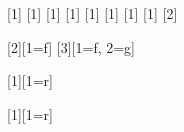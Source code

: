 \DeclarePairedDelimiterXPP{\Parens}[1]{\bm\begingroup}{\mathlarger{(}}{\mathlarger{)}}{\endgroup}{\mbox{}}
\DeclarePairedDelimiterXPP{\Braces}[1]{\bm\begingroup}{\mathlarger{\lbrace}}{\mathlarger{\rbrace}}{\endgroup}{\mbox{}}
\DeclarePairedDelimiterXPP{\Bracks}[1]{\bm\begingroup}{\mathlarger{[}}{\mathlarger{]}}{\endgroup}{\mbox{}}
\DeclarePairedDelimiterXPP{\Verts}[1]{\bm\begingroup}{\mathlarger{\lvert}}{\mathlarger{\rvert}}{\endgroup}{\mbox{}}
\DeclarePairedDelimiterXPP{\Dverts}[1]{\bm\begingroup}{\mathlarger{\lVert}}{\mathlarger{\rVert}}{\endgroup}{\mbox{}}
\DeclarePairedDelimiterXPP{\Angles}[1]{\bm\begingroup}{\mathlarger{\langle}}{\mathlarger{\rangle}}{\endgroup}{\mbox{}}
\DeclarePairedDelimiterXPP{\Ceils}[1]{\bm\begingroup}{\mathlarger{\lceil}}{\mathlarger{\rceil}}{\endgroup}{\mbox{}}
\DeclarePairedDelimiterXPP{\Floors}[1]{\bm\begingroup}{\mathlarger{\lfloor}}{\mathlarger{\rfloor}}{\endgroup}{\mbox{}}
\DeclarePairedDelimiterXPP{\Tuples}[2]{\bm\begingroup}{\mathlarger{(}}{\mathlarger{)}}{\endgroup}{\mbox{}}
\newcommand{\Abs}[1]{\Verts*{#1}}


%
%
\newcommand{\suchthat}{\mathrel{\mathsf{st}}}
\newcommand{\then}{\bm{\mathop{\mathlarger{,}}}\,}
\newcommand{\given}{\bm{\mathord{\mathlarger{\left. \middle\vert \right.}}}}
\newcommand{\by}{\bm{\mathord{\mathlarger{;}}}\ }


%
%
\DeclareMathOperator{\powerset}{\mathcal{P}}

\newcommand{\Set}[1]{\bm{\mathord{\mathlarger{\mleft\lbrace\vphantom{#1}\mright.}}} #1 \bm{\mathord{\mathlarger{\mleft.\vphantom{#1}\mright\rbrace}}}}

\newcommand{\PowerSet}[1]{\powerset\parens*{#1}}
\newcommand{\Cardinality}[1]{\verts*{#1}}


%
%
\DeclareMathOperator{\inverse}{^{-1}}
\newcommand{\Inverse}[1]{{#1}\inverse}

[2][1=f]{ }
[3][1=f, 2=g]{ }

[1][1=r]{%
}
[1][1=r]{%
}
\newcommand{\Bij}{\leftrightarrow} %


